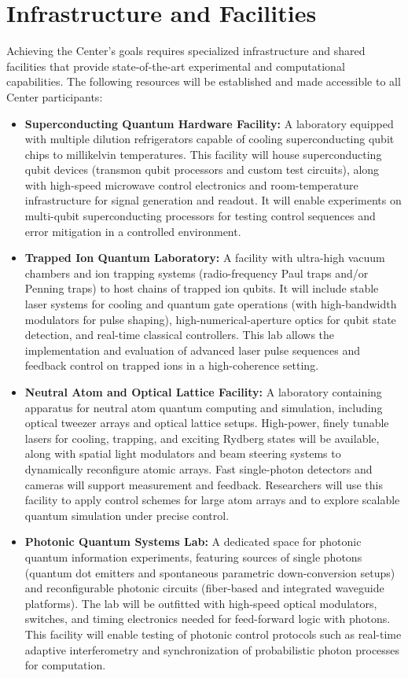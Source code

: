 \documentclass[11pt]{article}
\begin{document}
\section{Infrastructure and Facilities}
Achieving the Center's goals requires specialized infrastructure and shared facilities that provide state-of-the-art experimental and computational capabilities. The following resources will be established and made accessible to all Center participants:
\begin{itemize}
   \item \textbf{Superconducting Quantum Hardware Facility:} A laboratory equipped with multiple dilution refrigerators capable of cooling superconducting qubit chips to millikelvin temperatures. This facility will house superconducting qubit devices (transmon qubit processors and custom test circuits), along with high-speed microwave control electronics and room-temperature infrastructure for signal generation and readout. It will enable experiments on multi-qubit superconducting processors for testing control sequences and error mitigation in a controlled environment.
   \item \textbf{Trapped Ion Quantum Laboratory:} A facility with ultra-high vacuum chambers and ion trapping systems (radio-frequency Paul traps and/or Penning traps) to host chains of trapped ion qubits. It will include stable laser systems for cooling and quantum gate operations (with high-bandwidth modulators for pulse shaping), high-numerical-aperture optics for qubit state detection, and real-time classical controllers. This lab allows the implementation and evaluation of advanced laser pulse sequences and feedback control on trapped ions in a high-coherence setting.
   \item \textbf{Neutral Atom and Optical Lattice Facility:} A laboratory containing apparatus for neutral atom quantum computing and simulation, including optical tweezer arrays and optical lattice setups. High-power, finely tunable lasers for cooling, trapping, and exciting Rydberg states will be available, along with spatial light modulators and beam steering systems to dynamically reconfigure atomic arrays. Fast single-photon detectors and cameras will support measurement and feedback. Researchers will use this facility to apply control schemes for large atom arrays and to explore scalable quantum simulation under precise control.
   \item \textbf{Photonic Quantum Systems Lab:} A dedicated space for photonic quantum information experiments, featuring sources of single photons (quantum dot emitters and spontaneous parametric down-conversion setups) and reconfigurable photonic circuits (fiber-based and integrated waveguide platforms). The lab will be outfitted with high-speed optical modulators, switches, and timing electronics needed for feed-forward logic with photons. This facility will enable testing of photonic control protocols such as real-time adaptive interferometry and synchronization of probabilistic photon processes for computation.

\end{itemize}
\end{document}
